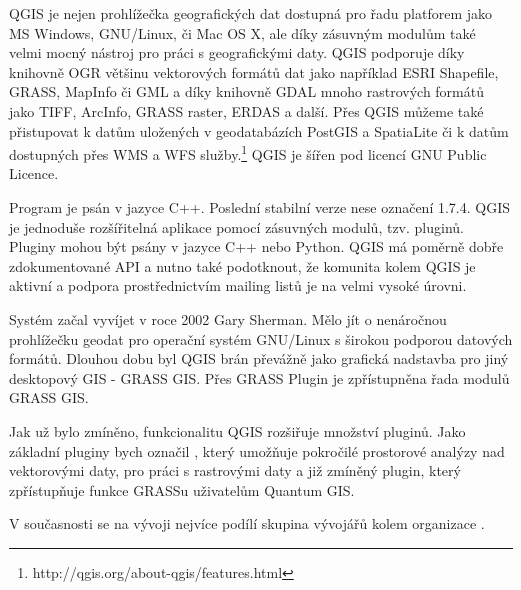 QGIS je nejen prohlížečka geografických dat dostupná pro řadu
platforem jako MS Windows, GNU/Linux, či Mac OS X, ale díky zásuvným
modulům také velmi mocný nástroj pro práci s geografickými daty. QGIS
podporuje díky knihovně OGR většinu vektorových formátů dat
jako například ESRI Shapefile, GRASS, MapInfo či GML a díky
knihovně  GDAL mnoho rastrových formátů jako TIFF,
ArcInfo, GRASS raster, ERDAS a další. Přes QGIS můžeme také
přistupovat k datům uložených v geodatabázích PostGIS a SpatiaLite či
k datům dostupných přes WMS a WFS
služby.\footnote{http://qgis.org/about-qgis/features.html} QGIS je
šířen pod licencí GNU Public Licence.

Program je psán v jazyce C++. Poslední stabilní verze nese označení
1.7.4. QGIS je jednoduše rozšířitelná aplikace pomocí zásuvných
modulů, tzv. pluginů. Pluginy mohou být psány v jazyce C++ nebo
Python. QGIS má poměrně dobře zdokumentované API a nutno také
podotknout, že komunita kolem QGIS je aktivní a podpora
prostřednictvím mailing listů je na velmi vysoké úrovni.

Systém začal vyvíjet v roce 2002 Gary Sherman. Mělo jít o nenáročnou
prohlížečku geodat pro operační systém GNU/Linux s širokou podporou
datových formátů. Dlouhou dobu byl QGIS brán převážně jako grafická
nadstavba pro jiný desktopový GIS - GRASS GIS. Přes GRASS Plugin je
zpřístupněna řada modulů GRASS GIS.

Jak už bylo zmíněno, funkcionalitu QGIS rozšiřuje množství
pluginů. Jako základní pluginy bych
označil  ,
který umožňuje pokročilé prostorové analýzy nad vektorovými
daty,  
pro práci s rastrovými daty a již zmíněný  
plugin, který zpřístupňuje funkce GRASSu uživatelům Quantum GIS.

V současnosti se na vývoji nejvíce podílí skupina vývojářů kolem
organizace .

